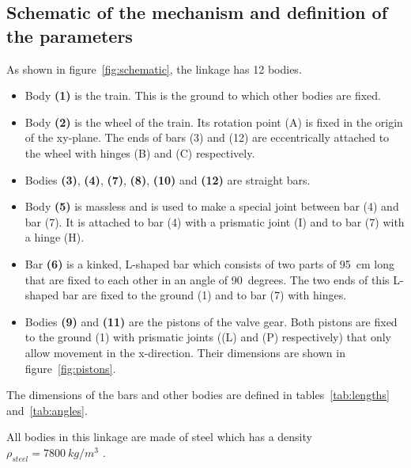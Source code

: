 \documentclass[a4paper]{article}
\begin{document}
\subsection{Schematic of the mechanism and definition of the parameters}

As shown in figure~\ref{fig:schematic}, the linkage has 12 bodies.

\begin{itemize}
	\item Body \textbf{(1)} is the train. This is the ground to which other bodies are fixed.
	\item Body \textbf{(2)} is the wheel of the train. Its rotation point (A) is fixed in the origin of the xy-plane. The ends of bars (3) and (12) are eccentrically attached to the wheel with hinges (B) and (C) respectively.
	\item Bodies \textbf{(3)}, \textbf{(4)}, \textbf{(7)}, \textbf{(8)}, \textbf{(10)} and \textbf{(12)} are straight bars.
	\item Body \textbf{(5)} is massless and is used to make a special joint between bar (4) and bar (7). It is attached to bar (4) with a prismatic joint (I) and to bar (7) with a hinge (H).
	\item Bar \textbf{(6)} is a kinked, L-shaped bar which consists of two parts of 95~\si{cm} long that are fixed to each other in an angle of 90~\si{degrees}. The two ends of this L-shaped bar are fixed to the ground (1) and to bar (7) with hinges.
	\item Bodies \textbf{(9)} and \textbf{(11)} are the pistons of the valve gear. Both pistons are fixed to the ground (1) with prismatic joints ((L) and (P) respectively) that only allow movement in the x-direction. Their dimensions are shown in figure~\ref{fig:pistons}.
\end{itemize}

The dimensions of the bars and other bodies are defined in tables~\ref{tab:lengths} and~\ref{tab:angles}.

All bodies in this linkage are made of steel which has a density \(\rho_{steel} = 7800~\si{kg/m^3}\) \cite{steel1}.
\end{document}
